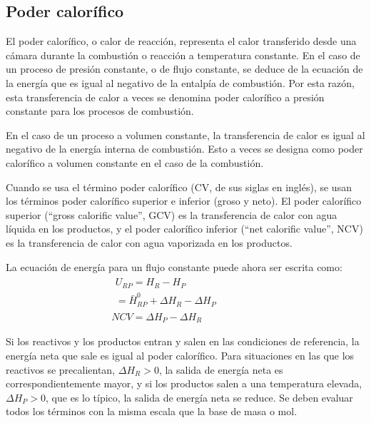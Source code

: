 \subsection{Poder calorífico}
\par El poder calorífico, o calor de reacción, representa el calor transferido desde una cámara durante la combustión o reacción a temperatura constante. En el caso de un proceso de presión constante, o de flujo constante, se deduce de la ecuación de la energía que es igual al negativo de la entalpía de combustión. Por esta razón, esta transferencia de calor a veces se denomina poder calorífico a presión constante para los procesos de combustión.
\par En el caso de un proceso a volumen constante, la transferencia de calor es igual al negativo de la energía interna de combustión. Esto a veces se designa como poder calorífico a volumen constante en el caso de la combustión.
\par Cuando se usa el término poder calorífico (CV, de sus siglas en inglés), se usan los términos poder calorífico superior e inferior (groso y neto). El poder calorífico superior (``gross calorific value'', GCV) es la transferencia de calor con agua líquida en los productos, y el poder calorífico inferior (``net calorific value'', NCV) es la transferencia de calor con agua vaporizada en los productos.
\par La ecuación de energía para un flujo constante puede ahora ser escrita como:
\begin{gather}
\label{eq:cv}
\begin{gathered}
U_{RP} = H_R - H_P \quad\quad\quad\quad\quad\quad
\quad\\
 = \bar H^0_{RP} + \Delta H_R - \Delta H_P
\end{gathered}\\
 NCV = \Delta H_P - \Delta H_R
\end{gather}
\par Si los reactivos y los productos entran y salen en las condiciones de referencia, la energía neta que sale es igual al poder calorífico. Para situaciones en las que los reactivos se precalientan, $\Delta H_R > 0$, la salida de energía neta es correspondientemente mayor, y si los productos salen a una temperatura elevada, $\Delta H_P > 0$, que es lo típico, la salida de energía neta se reduce. Se deben evaluar todos los términos con la misma escala que la base de masa o mol.

